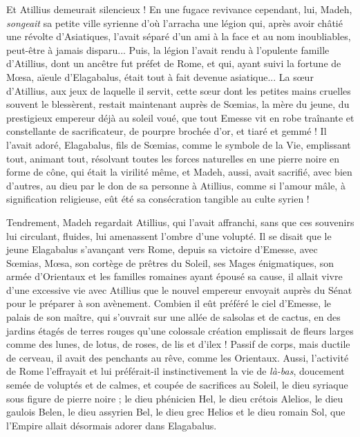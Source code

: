 \documentclass[a4paper, 11pt, oneside, polutonikogreek, french]{article}
\begin{document}
Et Atillius demeurait silencieux ! En une fugace revivance cependant, lui, Madeh, \emph{songeait} sa petite ville syrienne d'où l'arracha une légion qui, après avoir châtié une révolte d'Asiatiques, l'avait séparé d'un ami à la face et au nom inoubliables, peut-être à jamais disparu... Puis, la légion l'avait rendu à l'opulente famille d'Atillius, dont un ancêtre fut préfet de Rome, et qui, ayant suivi la fortune de Mœsa, aïeule d'Elagabalus, était tout à fait devenue asiatique... La sœur d'Atillius, aux jeux de laquelle il servit, cette sœur dont les petites mains cruelles souvent le blessèrent, restait maintenant auprès de Sœmias, la mère du jeune, du prestigieux empereur déjà au soleil voué, que tout Emesse vit en robe traînante et constellante de sacrificateur, de pourpre brochée d'or, et tiaré et gemmé ! Il l'avait adoré, Elagabalus, fils de Sœmias, comme le symbole de la Vie, emplissant tout, animant tout, résolvant toutes les forces naturelles en une pierre noire en forme de cône, qui était la virilité même, et Madeh, aussi, avait sacrifié, avec bien d'autres, au dieu par le don de sa personne à Atillius, comme si l'amour mâle, à signification religieuse, eût été sa consécration tangible au culte syrien !

Tendrement, Madeh regardait Atillius, qui l'avait affranchi, sans que ces souvenirs lui circulant, fluides, lui amenassent l'ombre d'une volupté. Il se disait que le jeune Elagabalus s'avançant vers Rome, depuis sa victoire d'Emesse, avec Sœmias, Mœsa, son cortège de prêtres du Soleil, ses Mages énigmatiques, son armée d'Orientaux et les familles romaines ayant épousé sa cause, il allait vivre d'une excessive vie avec Atillius que le nouvel empereur envoyait auprès du Sénat pour le préparer à son avènement. Combien il eût préféré le ciel d'Emesse, le palais de son maître, qui s'ouvrait sur une allée de salsolas et de cactus, en des jardins étagés de terres rouges qu'une colossale création emplissait de fleurs larges comme des lunes, de lotus, de roses, de lis et d'ilex ! Passif de corps, mais ductile de cerveau, il avait des penchants au rêve, comme les Orientaux. Aussi, l'activité de Rome l'effrayait et lui préférait-il instinctivement la vie de \emph{là-bas}, doucement semée de voluptés et de calmes, et coupée de sacrifices au Soleil, le dieu syriaque sous figure de pierre noire ; le dieu phénicien Hel, le dieu crétois Alelios, le dieu gaulois Belen, le dieu assyrien Bel, le dieu grec Helios et le dieu romain Sol, que l'Empire allait désormais adorer dans Elagabalus.
\end{document}
